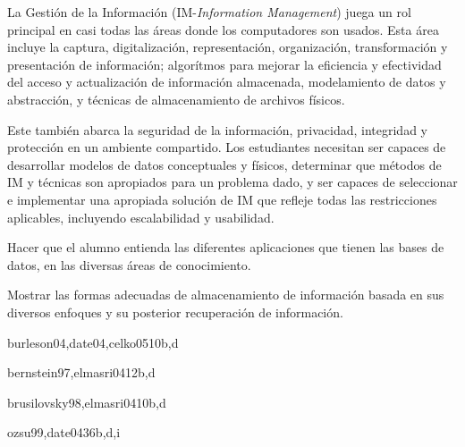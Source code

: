 \begin{syllabus}


\begin{justification}
La Gestión de la Información (IM-\textit{Information Management}) juega un rol principal en casi todas las áreas donde los computadores son usados. Esta área incluye la captura, digitalización, representación, organización, transformación y presentación de información; algorítmos para mejorar la eficiencia y efectividad del acceso y actualización de información almacenada, modelamiento de datos y abstracción, y técnicas de almacenamiento de archivos físicos.

Este también abarca la seguridad de la información, privacidad, integridad y protección en un ambiente compartido. Los estudiantes necesitan ser capaces de desarrollar modelos de datos conceptuales y físicos, determinar que métodos de IM y técnicas son apropiados para un problema dado, y ser capaces de seleccionar e implementar una apropiada solución de IM que refleje todas las restricciones aplicables, incluyendo escalabilidad y usabilidad.
\end{justification}

\begin{goals}
\item Hacer que el alumno entienda las diferentes aplicaciones que tienen las bases de datos, en las diversas áreas de conocimiento.
\item Mostrar las formas adecuadas de almacenamiento de información basada en sus diversos enfoques y su posterior recuperación de información.
\end{goals}


\begin{unit}{\IMPhysicalDatabaseDesign}{}{burleson04,date04,celko05}{10}{b,d}
    \IMPhysicalDatabaseDesignAllTopics%
    \IMPhysicalDatabaseDesignAllLearningOutcomes
\end{unit}

\begin{unit}{\IMTransactionProcessing}{}{bernstein97,elmasri04}{12}{b,d}
    \IMTransactionProcessingAllTopics
    \IMTransactionProcessingAllLearningOutcomes
\end{unit}

\begin{unit}{\IMInformationStorageandRetrieval}{}{brusilovsky98,elmasri04}{10}{b,d}
    \IMInformationStorageandRetrievalAllTopics
    \IMInformationStorageandRetrievalAllLearningOutcomes
\end{unit}

\begin{unit}{\IMDistributedDatabases}{}{ozsu99,date04}{36}{b,d,i}
    \IMDistributedDatabasesAllTopics
    \IMDistributedDatabasesAllLearningOutcomes
\end{unit}

\begin{coursebibliography}
\end{coursebibliography}

\end{syllabus}

%
    
